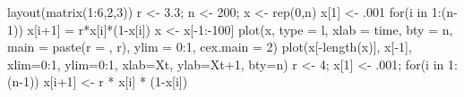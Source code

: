 \documentclass[
  a4paper,
  DIV=11,
  numbers=noendperiod,
  oneside]{scrreprt}
\newenvironment{Shaded}{}{}
\newcommand{\AttributeTok}[1]{\textcolor[rgb]{0.84,0.23,0.29}{#1}}
\newcommand{\ControlFlowTok}[1]{\textcolor[rgb]{0.84,0.23,0.29}{#1}}
\newcommand{\DecValTok}[1]{\textcolor[rgb]{0.00,0.36,0.77}{#1}}
\newcommand{\FloatTok}[1]{\textcolor[rgb]{0.00,0.36,0.77}{#1}}
\newcommand{\FunctionTok}[1]{\textcolor[rgb]{0.44,0.26,0.76}{#1}}
\newcommand{\NormalTok}[1]{\textcolor[rgb]{0.14,0.16,0.18}{#1}}
\newcommand{\OtherTok}[1]{\textcolor[rgb]{0.44,0.26,0.76}{#1}}
\newcommand{\SpecialCharTok}[1]{\textcolor[rgb]{0.00,0.36,0.77}{#1}}
\newcommand{\StringTok}[1]{\textcolor[rgb]{0.01,0.18,0.38}{#1}}
\begin{document}
\begin{Shaded}
\begin{Highlighting}[]
\FunctionTok{layout}\NormalTok{(}\FunctionTok{matrix}\NormalTok{(}\DecValTok{1}\SpecialCharTok{:}\DecValTok{6}\NormalTok{,}\DecValTok{2}\NormalTok{,}\DecValTok{3}\NormalTok{))}
\NormalTok{r }\OtherTok{\textless{}{-}} \FloatTok{3.3}\NormalTok{; n }\OtherTok{\textless{}{-}} \DecValTok{200}\NormalTok{; x }\OtherTok{\textless{}{-}} \FunctionTok{rep}\NormalTok{(}\DecValTok{0}\NormalTok{,n)}
\NormalTok{x[}\DecValTok{1}\NormalTok{] }\OtherTok{\textless{}{-}}\NormalTok{ .}\DecValTok{001}
\ControlFlowTok{for}\NormalTok{(i }\ControlFlowTok{in} \DecValTok{1}\SpecialCharTok{:}\NormalTok{(n}\DecValTok{{-}1}\NormalTok{)) x[i}\SpecialCharTok{+}\DecValTok{1}\NormalTok{] }\OtherTok{=}\NormalTok{ r}\SpecialCharTok{*}\NormalTok{x[i]}\SpecialCharTok{*}\NormalTok{(}\DecValTok{1}\SpecialCharTok{{-}}\NormalTok{x[i])}
\NormalTok{x }\OtherTok{\textless{}{-}}\NormalTok{ x[}\SpecialCharTok{{-}}\DecValTok{1}\SpecialCharTok{:{-}}\DecValTok{100}\NormalTok{]}
\FunctionTok{plot}\NormalTok{(x, }\AttributeTok{type =} \StringTok{\textquotesingle{}l\textquotesingle{}}\NormalTok{, }\AttributeTok{xlab =} \StringTok{\textquotesingle{}time\textquotesingle{}}\NormalTok{, }\AttributeTok{bty =} \StringTok{\textquotesingle{}n\textquotesingle{}}\NormalTok{, }
     \AttributeTok{main =} \FunctionTok{paste}\NormalTok{(}\StringTok{\textquotesingle{}r = \textquotesingle{}}\NormalTok{, r),}
     \AttributeTok{ylim =} \DecValTok{0}\SpecialCharTok{:}\DecValTok{1}\NormalTok{, }\AttributeTok{cex.main =} \DecValTok{2}\NormalTok{) }
\FunctionTok{plot}\NormalTok{(x[}\SpecialCharTok{{-}}\FunctionTok{length}\NormalTok{(x)], x[}\SpecialCharTok{{-}}\DecValTok{1}\NormalTok{], }
     \AttributeTok{xlim=}\DecValTok{0}\SpecialCharTok{:}\DecValTok{1}\NormalTok{, }\AttributeTok{ylim=}\DecValTok{0}\SpecialCharTok{:}\DecValTok{1}\NormalTok{, }\AttributeTok{xlab=}\StringTok{\textquotesingle{}Xt\textquotesingle{}}\NormalTok{, }\AttributeTok{ylab=}\StringTok{\textquotesingle{}Xt+1\textquotesingle{}}\NormalTok{, }\AttributeTok{bty=}\StringTok{\textquotesingle{}n\textquotesingle{}}\NormalTok{)}
\NormalTok{r }\OtherTok{\textless{}{-}} \DecValTok{4}\NormalTok{; x[}\DecValTok{1}\NormalTok{] }\OtherTok{\textless{}{-}}\NormalTok{ .}\DecValTok{001}\NormalTok{;}
\ControlFlowTok{for}\NormalTok{(i }\ControlFlowTok{in} \DecValTok{1}\SpecialCharTok{:}\NormalTok{(n}\DecValTok{{-}1}\NormalTok{)) x[i}\SpecialCharTok{+}\DecValTok{1}\NormalTok{] }\OtherTok{\textless{}{-}}\NormalTok{ r }\SpecialCharTok{*}\NormalTok{ x[i] }\SpecialCharTok{*}\NormalTok{ (}\DecValTok{1}\SpecialCharTok{{-}}\NormalTok{x[i])}

\end{Highlighting}
\end{Shaded}
\end{document}
